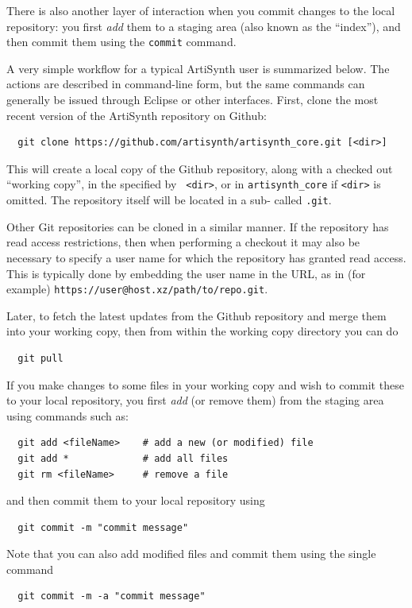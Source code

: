 There is also another layer of interaction when you commit changes to
the local repository: you first {\it add} them to a staging area
(also known as the ``index''), and then commit them using the {\tt commit}
command.

A very simple workflow for a typical ArtiSynth user is summarized
below. The actions are described in command-line form, but the same
commands can generally be issued through Eclipse or other
interfaces. First, clone the most recent version of the ArtiSynth
repository on Github:

\begin{verbatim}
  git clone https://github.com/artisynth/artisynth_core.git [<dir>]
\end{verbatim}

This will create a local copy of the Github repository, along with a
checked out ``working copy'', in the \directory{} specified by {\tt
<dir>}, or in {\tt artisynth\_core} if {\tt <dir>} is
omitted.  The repository itself will be located in a sub-\directory{}
called {\tt .git}.

Other Git repositories can be cloned in a similar manner.  If the
repository has read access restrictions, then when performing a checkout it
may also be necessary to specify a user name for which the repository
has granted read access. This is typically done by embedding the user
name in the URL, as in (for example)
{\tt https://user@host.xz/path/to/repo.git}.

Later, to fetch the latest updates from the Github repository and
merge them into your working copy, then from within the working copy
directory you can do
\begin{verbatim}
  git pull
\end{verbatim}

If you make changes to some files in your working copy and wish to
commit these to your local repository, you first {\it add} (or remove
them) from the staging area using commands such as:
\begin{verbatim}
  git add <fileName>    # add a new (or modified) file
  git add *             # add all files
  git rm <fileName>     # remove a file
\end{verbatim}
and then commit them to your local repository using
\begin{verbatim}
  git commit -m "commit message"
\end{verbatim}
Note that you can also add modified files and commit them using the single
command
\begin{verbatim}
  git commit -m -a "commit message"
\end{verbatim}

